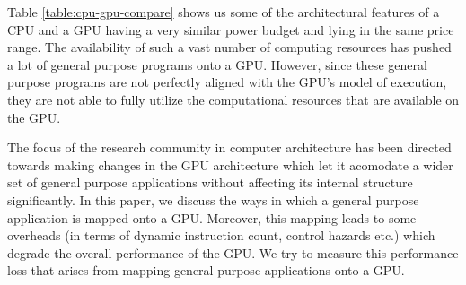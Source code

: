 \par{
	Table \ref{table:cpu-gpu-compare} shows us some of the architectural features of a CPU and a GPU having a very similar power budget and lying in the same price range. The availability of such a vast number of computing resources has pushed a lot of general purpose programs onto a GPU. However, since these general purpose programs are not perfectly aligned with the GPU's model of execution, they are not able to fully utilize the computational resources that are available on the GPU.
}

\par{The focus of the research community in computer architecture has been directed towards making changes in the GPU architecture which let it acomodate a wider set of general purpose applications without affecting its internal structure significantly. In this paper, we discuss the ways in which a general purpose application is mapped onto a GPU. Moreover, this mapping leads to some overheads (in terms of dynamic instruction count, control hazards etc.) which degrade the overall performance of the GPU. We try to measure this performance loss that arises from mapping general purpose applications onto a GPU.
}
